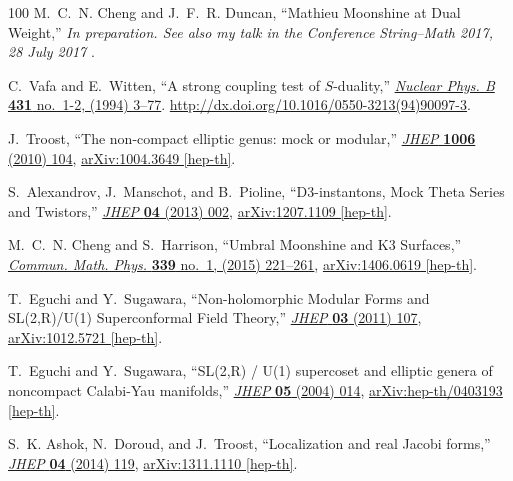 \begin{thebibliography}{100}
M.~C.~N. Cheng and J.~F.~R. Duncan, ``{Mathieu Moonshine at Dual Weight},''
  {\em In preparation. See also my talk in the Conference String--Math 2017, 28
  July 2017} .

C.~Vafa and E.~Witten, ``A strong coupling test of {$S$}-duality,''
  \href{http://dx.doi.org/10.1016/0550-3213(94)90097-3}{{\em Nuclear Phys. B}
  {\bfseries 431} no.~1-2, (1994) 3--77}.
  \url{http://dx.doi.org/10.1016/0550-3213(94)90097-3}.

J.~Troost, ``{The non-compact elliptic genus: mock or modular},''
  \href{http://dx.doi.org/10.1007/JHEP06(2010)104}{{\em JHEP} {\bfseries 1006}
  (2010) 104},
\href{http://arxiv.org/abs/1004.3649}{{\ttfamily arXiv:1004.3649 [hep-th]}}.

S.~Alexandrov, J.~Manschot, and B.~Pioline, ``{D3-instantons, Mock Theta Series
  and Twistors},'' \href{http://dx.doi.org/10.1007/JHEP04(2013)002}{{\em JHEP}
  {\bfseries 04} (2013) 002},
\href{http://arxiv.org/abs/1207.1109}{{\ttfamily arXiv:1207.1109 [hep-th]}}.

M.~C.~N. Cheng and S.~Harrison, ``{Umbral Moonshine and K3 Surfaces},''
  \href{http://dx.doi.org/10.1007/s00220-015-2398-5}{{\em Commun. Math. Phys.}
  {\bfseries 339} no.~1, (2015) 221--261},
\href{http://arxiv.org/abs/1406.0619}{{\ttfamily arXiv:1406.0619 [hep-th]}}.

T.~Eguchi and Y.~Sugawara, ``{Non-holomorphic Modular Forms and SL(2,R)/U(1)
  Superconformal Field Theory},''
  \href{http://dx.doi.org/10.1007/JHEP03(2011)107}{{\em JHEP} {\bfseries 03}
  (2011) 107},
\href{http://arxiv.org/abs/1012.5721}{{\ttfamily arXiv:1012.5721 [hep-th]}}.

T.~Eguchi and Y.~Sugawara, ``{SL(2,R) / U(1) supercoset and elliptic genera of
  noncompact Calabi-Yau manifolds},''
  \href{http://dx.doi.org/10.1088/1126-6708/2004/05/014}{{\em JHEP} {\bfseries
  05} (2004) 014},
\href{http://arxiv.org/abs/hep-th/0403193}{{\ttfamily arXiv:hep-th/0403193
  [hep-th]}}.

S.~K. Ashok, N.~Doroud, and J.~Troost, ``{Localization and real Jacobi
  forms},'' \href{http://dx.doi.org/10.1007/JHEP04(2014)119}{{\em JHEP}
  {\bfseries 04} (2014) 119},
\href{http://arxiv.org/abs/1311.1110}{{\ttfamily arXiv:1311.1110 [hep-th]}}.


\end{thebibliography}
